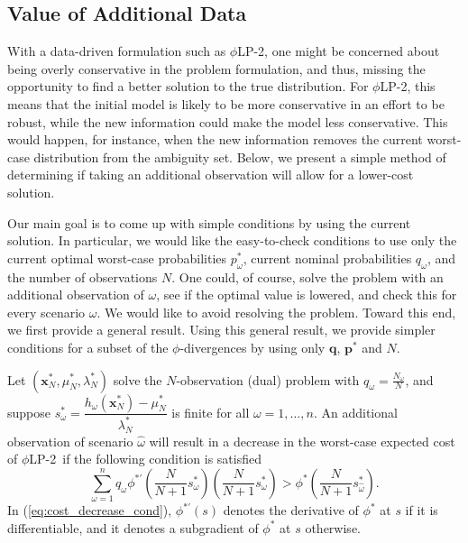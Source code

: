 \documentclass[opre,nonblindrev]{informs3} %
\newcommand{\x}{\mathbf{x}}
\newcommand{\q}{\mathbf{q}}
\newcommand{\p}{\mathbf{p}}
\newcommand{\plp}{$\phi$LP-2}
\begin{document}
\subsection{Value of Additional Data} \label{ssec:value}

With a data-driven formulation such as \plp, 
one might be concerned about being overly conservative in the problem formulation, and thus, missing the opportunity to find a better solution to the true distribution.
For \plp, this means that the initial model is likely to be more conservative in an effort to be robust, while the new information could make the model less conservative.
This would happen, for instance, when the new information removes the current worst-case distribution from the ambiguity set.  
Below, we present a simple method of determining if taking an additional observation will allow for a lower-cost solution.

Our main goal is to come up with simple conditions by using the current solution.
In particular, we would like the easy-to-check conditions to use only the current optimal worst-case probabilities $p_\omega^*$, current nominal probabilities $q_\omega$, and the number of observations $N$.
One could, of course, solve the problem with an additional observation of $\omega$, see if the optimal value is lowered, and check this for every scenario $\omega$. 
We would like to avoid resolving the problem. 
Toward this end, we first provide a general result. 
Using this general result, we provide simpler conditions for a subset of the $\phi$-divergences by using only $\q$, $\p^*$ and $N$. 

\begin{proposition}
	\label{prop:value}
	Let $(\x^*_N,\mu^*_N,\lambda^*_N)$ solve the $N$-observation (dual) problem with $q_\omega = \tfrac{N_\omega}{N}$, and suppose $s^*_\omega = \dfrac{h_\omega(\x^*_N) - \mu^*_N}{\lambda^*_N}$ is finite for all $\omega=1,\ldots,n$.
	An additional observation of scenario $\hat{\omega}$ will result in a decrease in the worst-case expected cost of \plp\ if the following condition is satisfied
	\begin{equation} \label{eq:cost_decrease_cond}
		\sum_{\omega=1}^n q_\omega \phi^{*\prime}\left(\frac{N}{N+1}s^*_\omega\right) \left(\frac{N}{N+1}s^*_\omega\right) > \phi^*\left(\frac{N}{N+1}s^*_{\hat{\omega}}\right).
	\end{equation}
	In (\ref{eq:cost_decrease_cond}), $\phi^{*\prime}(s)$ denotes the derivative of $\phi^{*}$ at $s$ if it is differentiable, and it denotes a subgradient of $\phi^{*}$ at $s$ otherwise. 
\end{proposition}
\end{document}
